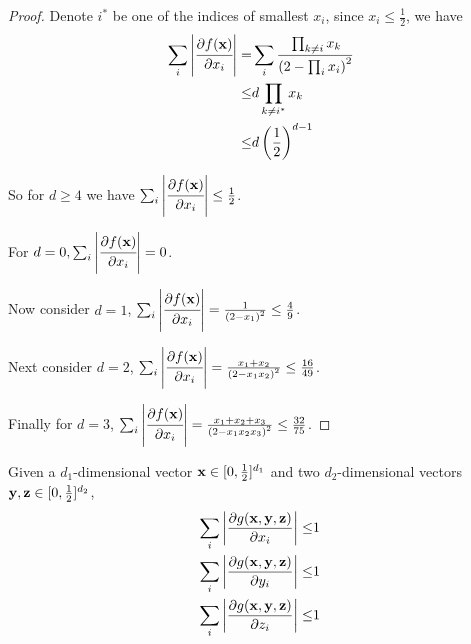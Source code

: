 	\begin{proof}
		Denote $i^*$ be one of the indices of smallest $x_i$, since $x_i \leq \frac{1}{2}$, we have
	\begin{align*}
		\sum_i \left\vert\cfrac{\partial f({\bf x})}{\partial x_i}\right\vert  =& \sum_i \cfrac{ \prod_{k \neq i} x_k  }{\left( 2 - \prod_i x_i \right)^2} \\
		\leq & d \prod_{k \neq i^*} x_k \\
		\leq & d \left( \frac{1}{2} \right)^{d-1}
	\end{align*}

	So for $d \geq 4$ we have $\sum_i \left\vert\cfrac{\partial f({\bf x})}{\partial x_i}\right\vert \leq \frac{1}{2}$.

	For $d=0, \sum_i\left\vert \cfrac{\partial f({\bf x})}{\partial x_i}\right\vert = 0$.

	Now consider $d=1$, $\sum_i\left\vert \cfrac{\partial f({\bf x})}{\partial x_i}\right\vert = \frac{1}{\left( 2 - x_1 \right)^2} \leq \frac{4}{9} $.

	Next consider $d=2$,  $\sum_i\left\vert \cfrac{\partial f({\bf x})}{\partial x_i}\right\vert = \frac{x_1 + x_2}{\left( 2 - x_1x_2 \right)^2} \leq \frac{16}{49} $.

	Finally for $d=3$,  $\sum_i\left\vert \cfrac{\partial f({\bf x})}{\partial x_i}\right\vert = \frac{x_1 + x_2 + x_3}{\left( 2 - x_1x_2x_3 \right)^2} \leq \frac{32}{75} $.
	\end{proof}


	\begin{Lem}
Given a $d_1$-dimensional vector ${\bf x} \in [0, \frac{1}{2}]^{d_1}$ and two $d_2$-dimensional vectors ${\bf y,z} \in [0, \frac{1}{2}]^{d_2}$,
\label{lemnormalpd}
		\begin{align*}
			 \sum_i\left\vert \frac{\partial g({\bf x,y,z})}{\partial x_i} \right\vert \leq & 1 \\
			\sum_i \left\vert \frac{\partial g({\bf x,y,z})}{\partial y_i} \right\vert \leq & 1 \\
			\sum_i \left\vert \frac{\partial g({\bf x,y,z})}{\partial z_i} \right\vert \leq & 1
		\end{align*}
	\end{Lem}

